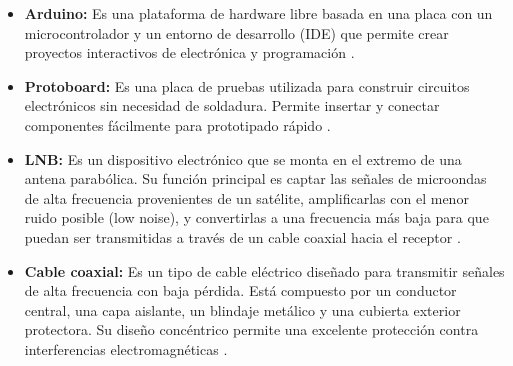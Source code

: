 \begin{itemize}
  \item \textbf{Arduino:} Es una plataforma de hardware libre basada en una placa
    con un microcontrolador y un entorno de desarrollo (IDE) que permite crear
    proyectos interactivos de electrónica y programación \cite{Arduino2025}.

  \item \textbf{Protoboard:} Es una placa de pruebas utilizada para construir
    circuitos electrónicos sin necesidad de soldadura.
    Permite insertar y conectar componentes fácilmente para prototipado rápido
    \cite{Horowitz1990}.

  \item \textbf{LNB:} Es un dispositivo electrónico que se monta en el extremo
    de una antena parabólica.
    Su función principal es captar las señales de microondas de alta frecuencia
    provenientes de un satélite, amplificarlas con el menor ruido posible
    (low noise), y convertirlas a una frecuencia más baja para que puedan ser
    transmitidas a través de un cable coaxial hacia el receptor \cite{ITU2025}.

  \item \textbf{Cable coaxial:} Es un tipo de cable eléctrico diseñado para
    transmitir señales de alta frecuencia con baja pérdida.
    Está compuesto por un conductor central, una capa aislante, un blindaje
    metálico y una cubierta exterior protectora.
    Su diseño concéntrico permite una excelente protección contra interferencias
    electromagnéticas \cite{Horowitz1990}.
\end{itemize}
